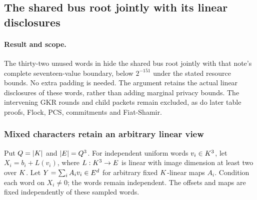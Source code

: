 \subsection{The shared bus root jointly with its linear disclosures}\label{note:zk-bus-root-joint}

\paragraph{Result and scope.} The thirty-two unused words in  hide the shared bus root jointly with that note's complete seventeen-value boundary, below $2^{-151}$ under the stated resource bounds. No extra padding is needed. The argument retains the actual linear disclosures of these words, rather than adding marginal privacy bounds. The intervening GKR rounds and child packets remain excluded, as do later table proofs, Flock, PCS, commitments and Fiat-Shamir.

\subsubsection{Mixed characters retain an arbitrary linear view}

Put $Q=|K|$ and $|E|=Q^3$. For independent uniform words $v_i\in K^3$, let $X_i=b_i+L(v_i)$, where $L:K^3\to E$ is linear with image dimension at least two over $K$. Let $Y=\sum_i A_i v_i\in E^d$ for arbitrary fixed $K$-linear maps $A_i$. Condition each word on $X_i\ne0$; the words remain independent. The offsets and maps are fixed independently of these sampled words.

